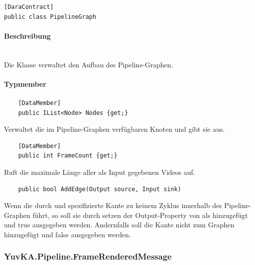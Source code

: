 \begin{verbatim}
[DaraContract]
public class PipelineGraph	
\end{verbatim}

\paragraph{Beschreibung}~\\
Die Klasse  verwaltet den Aufbau des Pipeline-Graphen. 
	
\paragraph{Typmember}
\begin{itemize}

	\begin{verbatim}
	[DataMember]
	public IList<Node> Nodes {get;}
	\end{verbatim}
	Verwaltet die im Pipeline-Graphen verfügbaren Knoten und gibt sie aus.

	\begin{verbatim}
	[DataMember]
	public int FrameCount {get;}
	\end{verbatim}
	Ruft die maximale Länge aller als Input gegebenen Videos auf.


	
	\begin{verbatim}
	public bool AddEdge(Output source, Input sink)
	\end{verbatim}
	Wenn die durch  und  spezifizierte Kante zu keinem Zyklus innerhalb des Pipeline-Graphen führt, so soll sie durch setzen der Output-Property von  als  hinzugefügt und true ausgegeben werden. Andernfalls soll die Kante nicht zum Graphen hinzugefügt und false ausgegeben werden.
\end{itemize}
	
\subsubsection{YuvKA.Pipeline.FrameRenderedMessage}
